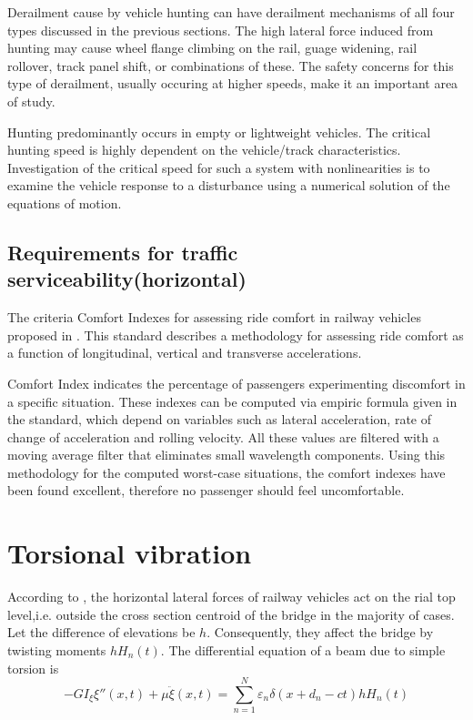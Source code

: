 Derailment cause by vehicle hunting can have derailment mechanisms of all four types discussed in the previous sections. The high lateral force induced from hunting may cause wheel flange climbing on the rail, guage widening, rail rollover, track panel shift, or combinations of these. The safety concerns for this type of derailment, usually occuring at higher speeds, make it an important area of study.

Hunting predominantly occurs in empty or lightweight vehicles. The critical hunting speed is highly dependent on the vehicle/track characteristics. Investigation of the critical speed for such a system with nonlinearities is to examine the vehicle response to a disturbance using a numerical solution of the equations of motion.

\subsection{Requirements for traffic serviceability(horizontal)}

The criteria Comfort Indexes for assessing ride comfort in railway vehicles proposed in \cite{12299}. This standard describes a methodology for assessing ride comfort as a function of longitudinal, vertical and transverse accelerations. 

Comfort Index indicates the percentage of passengers experimenting discomfort in a specific situation. These indexes can be computed via empiric formula given in the standard, which depend on variables such as lateral acceleration, rate of change of acceleration and rolling velocity. All these values are filtered with a moving average filter that eliminates small wavelength components. Using this methodology for the computed worst-case situations, the comfort indexes have been found excellent, therefore no passenger should feel uncomfortable. 

\section{Torsional vibration}
According to \cite[9.1.3]{fryba1996dynamics}, the horizontal lateral forces of railway vehicles act on the rial top level,i.e. outside the cross section centroid of the bridge in the majority of cases. Let the difference of elevations be $ h $. Consequently, they affect the bridge by twisting moments $ hH_n(t) $. The differential equation of a beam due to simple torsion is 
\begin{equation}
	-GI_\xi \xi''(x,t)+\mu \ddot{\xi}(x,t)=\sum_{n=1}^{N}\varepsilon_n \delta (x+d_n-ct)h H_n(t)
\end{equation}

